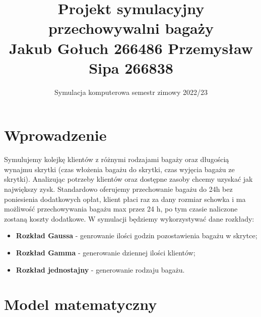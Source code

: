 \documentclass{article}
\title{{\textbf{Projekt symulacyjny przechowywalni bagaży }}\\ Jakub Gołuch 266486 Przemysław Sipa 266838}
\author{Symulacja komputerowa semestr zimowy 2022/23}
\begin{document}
\maketitle


\section{Wprowadzenie}
Symulujemy kolejkę klientów z różnymi rodzajami bagaży oraz długością wynajmu skrytki (czas włożenia bagażu do skrytki, czas wyjęcia bagażu ze skrytki). Analizując potrzeby klientów oraz dostępne zasoby chcemy uzyskać jak największy zysk. Standardowo oferujemy przechowanie bagażu do 24h bez poniesienia dodatkowych opłat, klient płaci raz za dany rozmiar schowka i ma możliwość przechowywania bagażu max przez 24 h, po tym czasie naliczone zostaną koszty dodatkowe. W symulacji będziemy wykorzystywać dane rozkłady:
\begin{itemize}
    \item {\textbf{Rozkład Gaussa}} - genrowanie ilości godzin pozostawienia bagażu w skrytce;
      \item {\textbf{Rozkład Gamma}} - generowanie dziennej ilości klientów;
        \item {\textbf{Rozkład jednostajny}} - generowanie rodzaju bagażu.
\end{itemize}
\section{Model matematyczny}
\end{document}
